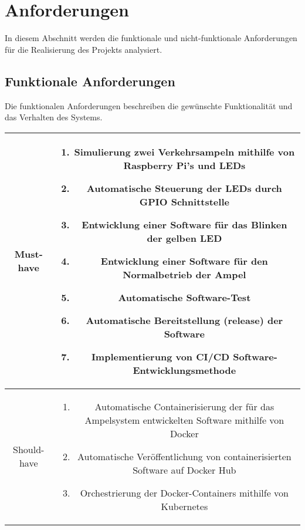 \section{Anforderungen}

In diesem Abschnitt werden die funktionale und nicht-funktionale Anforderungen für die Realisierung des Projekts analysiert.


\subsection{Funktionale Anforderungen}

Die funktionalen Anforderungen beschreiben die gewünschte Funktionalität und das Verhalten des Systems.


\begin{table}[h!]
	\begin{flushleft}
		{\small 
			\begin{tabular}{|c|c|}
				\hline
				Must-have & 
				\begin{minipage}{5in}
					 \begin{enumerate}
					 	\item Simulierung zwei Verkehrsampeln mithilfe von Raspberry Pi’s und LEDs
					 	\item Automatische Steuerung der LEDs durch GPIO Schnittstelle
					 	\item Entwicklung einer Software für das Blinken der gelben LED
					 	\item Entwicklung einer Software für den Normalbetrieb der Ampel
					 	\item Automatische Software-Test
					 	\item Automatische Bereitstellung (release) der Software
					 	\item Implementierung von CI/CD Software-Entwicklungsmethode
					 \end{enumerate}
				\end{minipage} \\
				\hline
				Should-have & 
				\begin{minipage}{5in}
					\begin{enumerate}
						\item Automatische Containerisierung der für das Ampelsystem entwickelten Software mithilfe von Docker
						\item Automatische Veröffentlichung von containerisierten Software auf Docker Hub
						\item Orchestrierung der Docker-Containers mithilfe von Kubernetes
					\end{enumerate}

\end{minipage}
\end{tabular}}
\end{flushleft}
\end{table}
